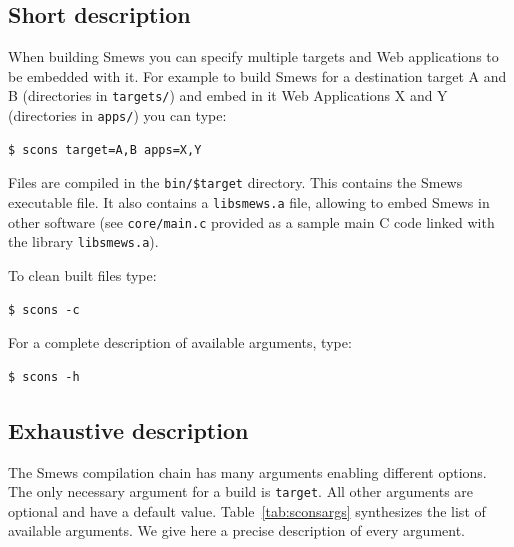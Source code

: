 \documentclass{report}
\newcommand{\rtab}[1]{Table~\ref{tab:#1}}
\begin{document}
\subsection{Short description}

When building Smews you can specify multiple targets and Web applications to be embedded with it. For example to build Smews for a destination target A and B (directories in \verb+targets/+) and embed in it Web Applications X and Y (directories in \verb+apps/+) you can type:

\begin{verbatim}
$ scons target=A,B apps=X,Y
\end{verbatim}

Files are compiled in the \verb+bin/$target+ directory. This contains the Smews executable file. It also contains a \verb+libsmews.a+ file, allowing to embed Smews in other software (see \verb+core/main.c+ provided as a sample main C code linked with the library \verb+libsmews.a+).

To clean built files type:
\begin{verbatim}
$ scons -c
\end{verbatim}

For a complete description of available arguments, type:
\begin{verbatim}
$ scons -h
\end{verbatim}

\subsection{Exhaustive description}
\label{sec:exha-descr}
The Smews compilation chain has many arguments enabling different options. The only necessary argument for a build is \verb+target+. All other arguments are optional and have a default value. \rtab{sconsargs} synthesizes the list of available arguments. We give here a precise description of every argument.
\end{document}
